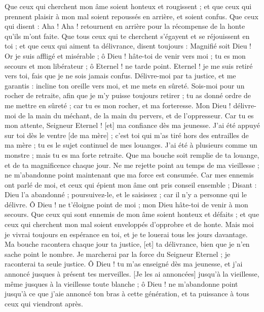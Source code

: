 \begin{multicols}{2}
Que ceux qui cherchent mon âme soient honteux et rougissent ; et que ceux qui prennent plaisir à mon mal soient repoussés en arrière, et soient confus.
Que ceux qui disent : Aha ! Aha ! retournent en arrière pour la récompense de la honte qu'ils m'ont faite.
Que tous ceux qui te cherchent s'égayent et se réjouissent en toi ; et que ceux qui aiment ta délivrance, disent toujours : Magnifié soit Dieu !
Or je suis affligé et misérable ; ô Dieu ! hâte-toi de venir vers moi ; tu es mon secours et mon libérateur ; ô Eternel ! ne tarde point.
\VerseOne{}Eternel ! je me suis retiré vers toi, fais que je ne sois jamais confus.
Délivre-moi par ta justice, et me garantis : incline ton oreille vers moi, et me mets en sûreté.
Sois-moi pour un rocher de retraite, afin que je m'y puisse toujours retirer ; tu as donné ordre de me mettre en sûreté ; car tu es mon rocher, et ma forteresse.
Mon Dieu ! délivre-moi de la main du méchant, de la main du pervers, et de l'oppresseur.
Car tu es mon attente, Seigneur Eternel ! [et] ma confiance dès ma jeunesse.
J'ai été appuyé sur toi dès le ventre [de ma mère] ; c'est toi qui m'as tiré hors des entrailles de ma mère ; tu es le sujet continuel de mes louanges.
J'ai été à plusieurs comme un monstre ; mais tu es ma forte retraite.
Que ma bouche soit remplie de ta louange, et de ta magnificence chaque jour.
Ne me rejette point au temps de ma vieillesse ; ne m'abandonne point maintenant que ma force est consumée.
Car mes ennemis ont parlé de moi, et ceux qui épient mon âme ont pris conseil ensemble ;
Disant : Dieu l'a abandonné ; poursuivez-le, et le saisissez ; car il n'y a personne qui le délivre.
Ô Dieu ! ne t'éloigne point de moi ; mon Dieu hâte-toi de venir à mon secours.
Que ceux qui sont ennemis de mon âme soient honteux et défaits ; et que ceux qui cherchent mon mal soient enveloppés d'opprobre et de honte.
Mais moi je vivrai toujours en espérance en toi, et je te louerai tous les jours davantage.
Ma bouche racontera chaque jour ta justice, [et] ta délivrance, bien que je n'en sache point le nombre.
Je marcherai par la force du Seigneur Eternel ; je raconterai ta seule justice.
Ô Dieu ! tu m'as enseigné dès ma jeunesse, et j'ai annoncé jusques à présent tes merveilles.
[Je les ai annoncées] jusqu’à la vieillesse, même jusques à la vieillesse toute blanche ; ô Dieu ! ne m'abandonne point jusqu’à ce que j'aie annoncé ton bras à cette génération, et ta puissance à tous ceux qui viendront après.

\end{multicols}
